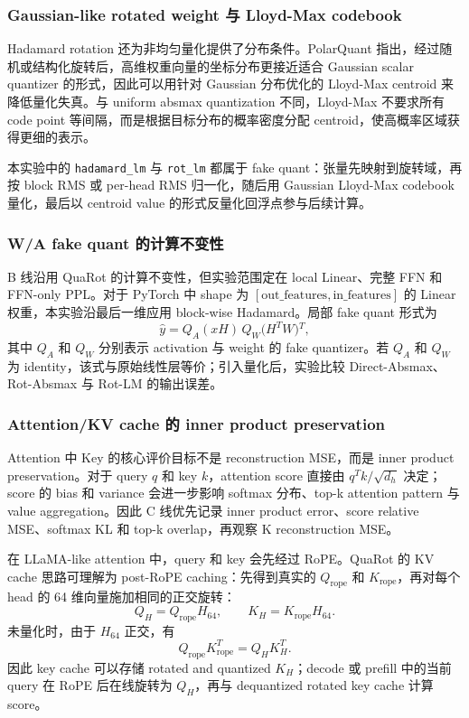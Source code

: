 \documentclass[lang=cn,chinesefont=nofont,a4paper,newtx]{elegantpaper}
\begin{document}
\subsubsection{Gaussian-like rotated weight 与 Lloyd-Max codebook}

Hadamard rotation 还为非均匀量化提供了分布条件。PolarQuant 指出，经过随机或结构化旋转后，高维权重向量的坐标分布更接近适合 Gaussian scalar quantizer 的形式，因此可以用针对 Gaussian 分布优化的 Lloyd-Max centroid 来降低量化失真\cite{polarquant2026}。与 uniform absmax quantization 不同，Lloyd-Max 不要求所有 code point 等间隔，而是根据目标分布的概率密度分配 centroid，使高概率区域获得更细的表示。

本实验中的 \texttt{hadamard\_lm} 与 \texttt{rot\_lm} 都属于 fake quant：张量先映射到旋转域，再按 block RMS 或 per-head RMS 归一化，随后用 Gaussian Lloyd-Max codebook 量化，最后以 centroid value 的形式反量化回浮点参与后续计算。

\subsubsection{W/A fake quant 的计算不变性}

B 线沿用 QuaRot 的计算不变性，但实验范围定在 local Linear、完整 FFN 和 FFN-only PPL。对于 PyTorch 中 shape 为 $[\text{out\_features}, \text{in\_features}]$ 的 Linear 权重，本实验沿最后一维应用 block-wise Hadamard。局部 fake quant 形式为
\begin{equation}
  \hat{y}
  =
  Q_A(xH)\,Q_W\!\bigl(H^{T}W\bigr){}^{T},
\end{equation}
其中 $Q_A$ 和 $Q_W$ 分别表示 activation 与 weight 的 fake quantizer。若 $Q_A$ 和 $Q_W$ 为 identity，该式与原始线性层等价；引入量化后，实验比较 Direct-Absmax、Rot-Absmax 与 Rot-LM 的输出误差。

\subsubsection{Attention/KV cache 的 inner product preservation}

Attention 中 Key 的核心评价目标不是 reconstruction MSE，而是 inner product preservation。对于 query $q$ 和 key $k$，attention score 直接由 $q^{T}k/\sqrt{d_h}$ 决定；score 的 bias 和 variance 会进一步影响 softmax 分布、top-k attention pattern 与 value aggregation。因此 C 线优先记录 inner product error、score relative MSE、softmax KL 和 top-k overlap，再观察 K reconstruction MSE。

在 LLaMA-like attention 中，query 和 key 会先经过 RoPE。QuaRot 的 KV cache 思路可理解为 post-RoPE caching：先得到真实的 $Q_{\mathrm{rope}}$ 和 $K_{\mathrm{rope}}$，再对每个 head 的 64 维向量施加相同的正交旋转\cite{quarot2024}：
\begin{equation}
  Q_H = Q_{\mathrm{rope}}H_{64}, \qquad
  K_H = K_{\mathrm{rope}}H_{64}.
\end{equation}
未量化时，由于 $H_{64}$ 正交，有
\begin{equation}
  Q_{\mathrm{rope}}K_{\mathrm{rope}}^{T}
  =
  Q_H K_H^{T}.
\end{equation}
因此 key cache 可以存储 rotated and quantized $K_H$；decode 或 prefill 中的当前 query 在 RoPE 后在线旋转为 $Q_H$，再与 dequantized rotated key cache 计算 score。
\end{document}
